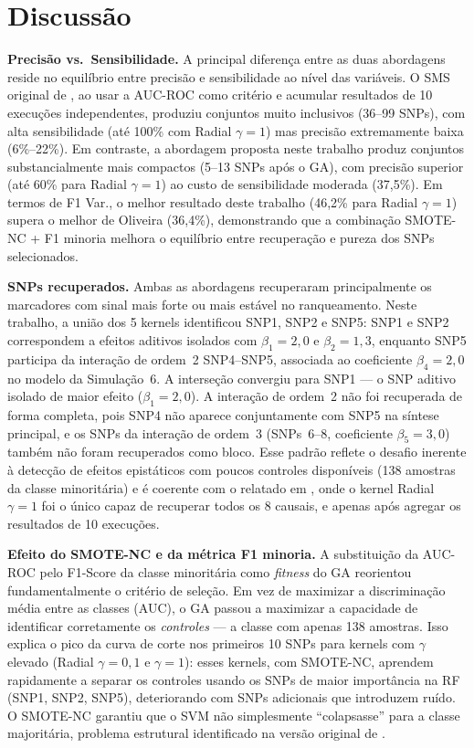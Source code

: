 \documentclass[
    12pt,
    a4paper,
    oneside,
    english,
    french,
    spanish,
    brazil
    ]{abntex2}
\newcommand{\novo}[1]{\textcolor{corNova}{#1}}
\begin{document}
\section*{Discussão}

\novo{\textbf{Precisão vs.\ Sensibilidade.}
A principal diferença entre as duas abordagens reside no equilíbrio entre precisão e sensibilidade ao nível das variáveis. O SMS original de \citeonline{Oliveira2015}, ao usar a AUC-ROC como critério e acumular resultados de 10 execuções independentes, produziu conjuntos muito inclusivos (36--99 SNPs), com alta sensibilidade (até 100\% com Radial $\gamma=1$) mas precisão extremamente baixa (6\%--22\%). Em contraste, a abordagem proposta neste trabalho produz conjuntos substancialmente mais compactos (5--13 SNPs após o GA), com precisão superior (até 60\% para Radial $\gamma=1$) ao custo de sensibilidade moderada (37,5\%). Em termos de F1 Var., o melhor resultado deste trabalho (46,2\% para Radial $\gamma=1$) supera o melhor de Oliveira (36,4\%), demonstrando que a combinação SMOTE-NC + F1 minoria melhora o equilíbrio entre recuperação e pureza dos SNPs selecionados.}

\novo{\textbf{SNPs recuperados.}
Ambas as abordagens recuperaram principalmente os marcadores com sinal mais forte ou mais estável no ranqueamento. Neste trabalho, a união dos 5 kernels identificou SNP1, SNP2 e SNP5: SNP1 e SNP2 correspondem a efeitos aditivos isolados com $\beta_1=2{,}0$ e $\beta_2=1{,}3$, enquanto SNP5 participa da interação de ordem~2 SNP4--SNP5, associada ao coeficiente $\beta_4=2{,}0$ no modelo da Simulação~6. A interseção convergiu para SNP1 --- o SNP aditivo isolado de maior efeito ($\beta_1=2{,}0$). A interação de ordem~2 não foi recuperada de forma completa, pois SNP4 não aparece conjuntamente com SNP5 na síntese principal, e os SNPs da interação de ordem~3 (SNPs~6--8, coeficiente $\beta_5=3{,}0$) também não foram recuperados como bloco. Esse padrão reflete o desafio inerente à detecção de efeitos epistáticos com poucos controles disponíveis (138 amostras da classe minoritária) e é coerente com o relatado em \citeonline{Oliveira2015}, onde o kernel Radial $\gamma=1$ foi o único capaz de recuperar todos os 8 causais, e apenas após agregar os resultados de 10 execuções.}

\novo{\textbf{Efeito do SMOTE-NC e da métrica F1 minoria.}
A substituição da AUC-ROC pelo F1-Score da classe minoritária como \textit{fitness} do GA reorientou fundamentalmente o critério de seleção. Em vez de maximizar a discriminação média entre as classes (AUC), o GA passou a maximizar a capacidade de identificar corretamente os \textit{controles} --- a classe com apenas 138 amostras. Isso explica o pico da curva de corte nos primeiros 10 SNPs para kernels com $\gamma$ elevado (Radial $\gamma=0{,}1$ e $\gamma=1$): esses kernels, com SMOTE-NC, aprendem rapidamente a separar os controles usando os SNPs de maior importância na RF (SNP1, SNP2, SNP5), deteriorando com SNPs adicionais que introduzem ruído. O SMOTE-NC garantiu que o SVM não simplesmente ``colapsasse'' para a classe majoritária, problema estrutural identificado na versão original de \citeonline{Oliveira2015}.}
\end{document}
